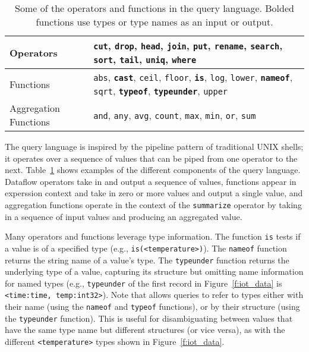 \begin{table}[t]
\begin{center}
\small
 \begin{tabularx}{\columnwidth}{|p{2.6cm}|X|}
\hline
Operators & \texttt{cut}, \texttt{drop}, \texttt{head}, \texttt{join}, \texttt{put}, \texttt{rename}, \texttt{search}, \texttt{sort}, \texttt{tail}, \texttt{uniq}, \texttt{where} \\
\hline
Functions & \texttt{abs}, {\bf\texttt{cast}}, \texttt{ceil}, \texttt{floor}, {\bf \texttt{is}}, \texttt{log}, \texttt{lower}, {\bf \texttt{nameof}}, \texttt{sqrt}, {\bf \texttt{typeof}}, {\bf \texttt{typeunder}}, \texttt{upper}\\
\hline
Aggregation Functions & \texttt{and}, \texttt{any}, \texttt{avg}, \texttt{count}, \texttt{max}, \texttt{min}, \texttt{or}, \texttt{sum} \\
\hline
 \end{tabularx}
\end{center}
\caption{Some of the operators and functions in the \sys{} query language. Bolded functions use types or type names as an input or output.}
\label{t:query_language}
\vspace{-1em}
\end{table}

The \sys{} query language is inspired by the pipeline pattern of traditional UNIX shells; it operates over a sequence of \sys{} values that can be piped from one operator to the next. Table~\ref{t:query_language} shows examples of the different components of the \sys{} query language. Dataflow operators take in and output a sequence of \sys{} values, functions appear in experssion context and take in zero or more \sys{} values and output a single \sys{} value, and aggregation functions operate in the context of the \texttt{summarize} operator by taking in a sequence of input values and producing an aggregated value.

Many \sys{} operators and functions leverage type information. The function \texttt{is} tests if a value is of a specified type (e.g., \texttt{is(<temperature>)}). The \texttt{nameof} function returns the string name of a value's type. The \texttt{typeunder} function returns the underlying type of a value, capturing its structure but omitting name information for named types (e.g., \texttt{typeunder} of the first record in Figure~\ref{f:iot_data} is \texttt{<{time:time,} \texttt{temp:int32}>}). Note that \sys{} allows queries to refer to types either with their name (using the \texttt{nameof} and \texttt{typeof} functions), or by their structure (using the \texttt{typeunder} function). This is useful for disambiguating between values that have the same type name but different structures (or vice versa), as with the different \texttt{<temperature>} types shown in Figure~\ref{f:iot_data}.

